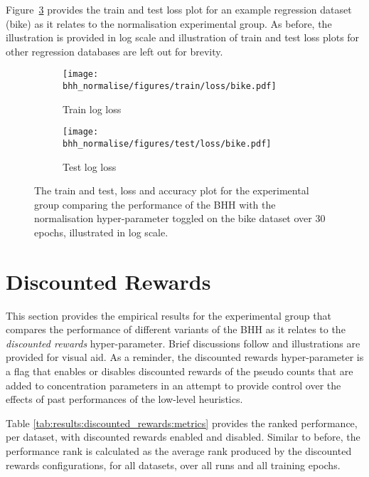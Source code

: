 Figure~\ref{fig:results:normalise:figures:bike} provides the train and test loss plot for an example regression dataset (bike) as it relates to the normalisation experimental group. As before, the illustration is provided in log scale and illustration of train and test loss plots for other regression databases are left out for brevity.


\begin{figure}[htbp]
	\begin{subfigure}{0.5\textwidth}
		\centering
		\texttt{[image: bhh\_normalise/figures/train/loss/bike.pdf]}
		\caption{Train log loss}
		\label{fig:results:normalise:figures:loss:train:bike}
	\end{subfigure}
	\begin{subfigure}{0.5\textwidth}
		\centering
		\texttt{[image: bhh\_normalise/figures/test/loss/bike.pdf]}
		\caption{Test log loss}
		\label{fig:results:normalise:figures:loss:test:bike}
	\end{subfigure}
	\par\bigskip
	\caption{The train and test, loss and accuracy plot for the experimental group comparing the performance of the \acs{BHH} with the normalisation hyper-parameter toggled on the bike dataset over 30 epochs, illustrated in log scale.}
	\label{fig:results:normalise:figures:bike}
\end{figure}



\section{Discounted Rewards}\label{sec:results:discounted_rewards}

This section provides the empirical results for the experimental group that compares the performance of different variants of the \acs{BHH} as it relates to the \textit{discounted rewards} hyper-parameter. Brief discussions follow and illustrations are provided for visual aid. As a reminder, the discounted rewards hyper-parameter is a flag that enables or disables discounted rewards of the pseudo counts that are added to concentration parameters in an attempt to provide control over the effects of past performances of the low-level heuristics.

Table \ref{tab:results:discounted_rewards:metrics} provides the ranked performance, per dataset, with discounted rewards enabled and disabled. Similar to before, the performance rank is calculated as the average rank produced by the discounted rewards configurations, for all datasets, over all runs and all training epochs.

